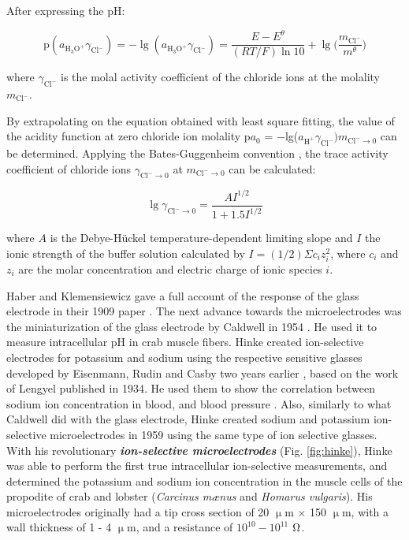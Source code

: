 After expressing the pH:

\begin{equation}
\textrm{p}(a_{\textrm{H}_3\textrm{O}^+}\gamma_{\textrm{Cl}^-}) = -\lg(a_{\textrm{H}_3\textrm{O}^+}\gamma_{\textrm{Cl}^-}) = \frac{E - E^\theta}{(RT/F)\ln10} + \lg \bigg(\frac{m_{\textrm{Cl}^-}}{m^\theta}\bigg)
\end{equation}

where $\gamma_{\textrm{Cl}^-}$ is the molal activity coefficient of the chloride ions at the molality $m_{\textrm{Cl}^-}$.

By extrapolating on the equation obtained with least square fitting, the value of the acidity function at zero chloride ion molality p$a_0$ = $-$lg($a_{\textrm{H}^+} \gamma _{\textrm{Cl}^-})m_{\textrm{Cl}^- \to 0}$ can be determined.
Applying the Bates-Guggenheim convention \cite{bates1960report}, the trace activity coefficient of chloride ions $\gamma_{\textrm{Cl}^- \to 0}$ at $m_{\textrm{Cl}^- \to 0}$ can be calculated:

\begin{equation}
\lg \gamma_{\textrm{Cl}^- \to 0} = \frac{A I^{1/2}}{1 + 1.5I^{1/2}}
\end{equation}

where $A$ is the Debye-Hückel temperature-dependent limiting slope and $I$ the ionic strength of the buffer solution calculated by $I = (1/2) \Sigma c_i z_{i}^{2}$, where $c_i$ and $z_i$ are the molar concentration and electric charge of ionic species $i$.

Haber and Klemensiewicz gave a full account of the response of the glass electrode in their 1909 paper \cite{haber1909elektrische, haber1909concerning}.
The next advance towards the microelectrodes was the miniaturization of the glass electrode by Caldwell in 1954 \cite{caldwell1954investigation}.
He used it to measure intracellular pH in crab muscle fibers.
Hinke created ion-selective electrodes for potassium and sodium using the respective sensitive glasses developed by Eisenmann, Rudin and Casby two years earlier \cite{eisenman1957glass}, based on the work of Lengyel \cite{lengyel1934behaviour} published in 1934.
He used them to show the correlation between sodium ion concentration in blood, and blood pressure \cite{friedman1958use, friedman1959drug}.
Also, similarly to what Caldwell did with the glass electrode, Hinke created sodium and potassium ion-selective microelectrodes in 1959 \cite{hinke1959glass} using the same type of ion selective glasses.
With his revolutionary \textbf{\emph{ion-selective microelectrodes}} (Fig. \ref{fig:hinke}), Hinke was able to perform the first true intracellular ion-selective measurements, and determined the potassium and sodium ion concentration in the muscle cells of the propodite of crab and lobster (\emph{Carcinus m\ae nus} and \emph{Homarus vulgaris}).
His microelectrodes originally had a tip cross section of 20 $\upmu$m $\times$ 150 $\upmu$m, with a wall thickness of 1 - 4 $\upmu$m, and a resistance of $10^{10} - 10^{11}$ $\ohm$.

